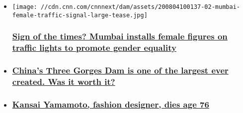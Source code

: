 \begin{itemize}
\item
  \href{/style/article/mumbai-traffic-light-women-intl-hnk-scli/index.html}{}

  \texttt{[image: //cdn.cnn.com/cnnnext/dam/assets/200804100137-02-mumbai-female-traffic-signal-large-tease.jpg]}

  \hypertarget{sign-of-the-times-mumbai-installs-female-figures-on-traffic-lights-to-promote-gender-equality}{%
  \subsubsection{\texorpdfstring{\href{/style/article/mumbai-traffic-light-women-intl-hnk-scli/index.html}{Sign
  of the times? Mumbai installs female figures on traffic lights to
  promote gender
  equality}}{Sign of the times? Mumbai installs female figures on traffic lights to promote gender equality}}\label{sign-of-the-times-mumbai-installs-female-figures-on-traffic-lights-to-promote-gender-equality}}
\item
  \hypertarget{chinas-three-gorges-dam-is-one-of-the-largest-ever-created-was-it-worth-it}{%
  \subsubsection{\texorpdfstring{\href{/style/article/china-three-gorges-dam-intl-hnk-dst/index.html}{China's
  Three Gorges Dam is one of the largest ever created. Was it worth
  it?}}{China's Three Gorges Dam is one of the largest ever created. Was it worth it?}}\label{chinas-three-gorges-dam-is-one-of-the-largest-ever-created-was-it-worth-it}}
\item
  \hypertarget{kansai-yamamoto-fashion-designer-dies-age-76}{%
  \subsubsection{\texorpdfstring{\href{/style/article/kansai-yamamoto-fashion-designer/index.html}{Kansai
  Yamamoto, fashion designer, dies age
  76}}{Kansai Yamamoto, fashion designer, dies age 76}}\label{kansai-yamamoto-fashion-designer-dies-age-76}}
\end{itemize}

